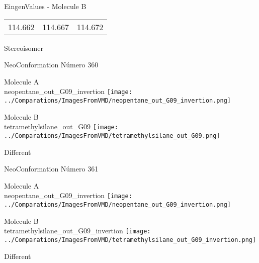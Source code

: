 \begin{multicols}{2}
\begin{center}
\vtab
 EingenValues - Molecule B     \\
\vtab
\begin{tabular}{|c c c|}
114.662	 & 	114.667	 & 	114.672	 \\
\end{tabular}

\end{center}
\end{multicols}
\begin{center}
\vtab
\vtab
\textcolor{NavyBlue}{\Large Stereoisomer}
\end{center}

 \newpage

\vtab[-2cm]
\begin{center}
{\large NeoConformation \tab Número 360}
\end{center}
\begin{multicols}{2}
\begin{center}
Molecule A \\ 
neopentane\_out\_G09\_invertion
\texttt{[image: ../Comparations/ImagesFromVMD/neopentane\_out\_G09\_invertion.png]}
\\
\vtab

\columnbreak
Molecule B \\ 
tetramethylsilane\_out\_G09
\texttt{[image: ../Comparations/ImagesFromVMD/tetramethylsilane\_out\_G09.png]}
\\
\vtab


\end{center}
\end{multicols}
\begin{center}
\vtab
\vtab
\textcolor{NavyBlue}{\Large Different}
\end{center}

 \newpage

\vtab[-2cm]
\begin{center}
{\large NeoConformation \tab Número 361}
\end{center}
\begin{multicols}{2}
\begin{center}
Molecule A \\ 
neopentane\_out\_G09\_invertion
\texttt{[image: ../Comparations/ImagesFromVMD/neopentane\_out\_G09\_invertion.png]}
\\
\vtab

\columnbreak
Molecule B \\ 
tetramethylsilane\_out\_G09\_invertion
\texttt{[image: ../Comparations/ImagesFromVMD/tetramethylsilane\_out\_G09\_invertion.png]}
\\
\vtab


\end{center}
\end{multicols}
\begin{center}
\vtab
\vtab
\textcolor{NavyBlue}{\Large Different}
\end{center}

